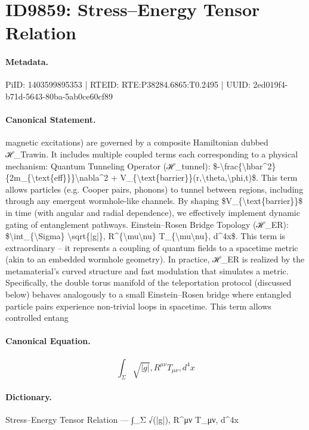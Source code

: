 \section*{ID9859: Stress–Energy Tensor Relation}
\paragraph{Metadata.}
PiID: 1403599895353 | RTEID: RTE:P38284.6865:T0.2495 | UUID: 2ed019f4-b71d-5643-80ba-5ab0ce60cf89

\paragraph{Canonical Statement.}
magnetic excitations) are governed by a composite Hamiltonian dubbed ℋ\_Trawin. It includes multiple coupled terms each corresponding to a physical mechanism: Quantum Tunneling Operator (ℋ\_tunnel): \$-\textbackslash{}frac\{\textbackslash{}hbar\textasciicircum{}2\}\{2m\_\{\textbackslash{}text\{eff\}\}\}\textbackslash{}nabla\textasciicircum{}2 + V\_\{\textbackslash{}text\{barrier\}\}(r,\textbackslash{}theta,\textbackslash{}phi,t)\$. This term allows particles (e.g. Cooper pairs, phonons) to tunnel between regions, including through any emergent wormhole-like channels. By shaping \$V\_\{\textbackslash{}text\{barrier\}\}\$ in time (with angular and radial dependence), we effectively implement dynamic gating of entanglement pathways. Einstein–Rosen Bridge Topology (ℋ\_ER): \$\textbackslash{}int\_\{\textbackslash{}Sigma\} \textbackslash{}sqrt\{|g|\}, R\textasciicircum{}\{\textbackslash{}mu\textbackslash{}nu\} T\_\{\textbackslash{}mu\textbackslash{}nu\}, d\textasciicircum{}4x\$. This term is extraordinary – it represents a coupling of quantum fields to a spacetime metric (akin to an embedded wormhole geometry). In practice, ℋ\_ER is realized by the metamaterial’s curved structure and fast modulation that simulates a metric. Specifically, the double torus manifold of the teleportation protocol (discussed below) behaves analogously to a small Einstein–Rosen bridge where entangled particle pairs experience non-trivial loops in spacetime. This term allows controlled entang

\paragraph{Canonical Equation.}
\[
\int_{\Sigma} \sqrt{|g|}, R^{\mu\nu} T_{\mu\nu}, d^4x
\]

\paragraph{Dictionary.}
Stress–Energy Tensor Relation — ∫\_Σ √(|g|), R\textasciicircum{}μν T\_μν, d\textasciicircum{}4x

